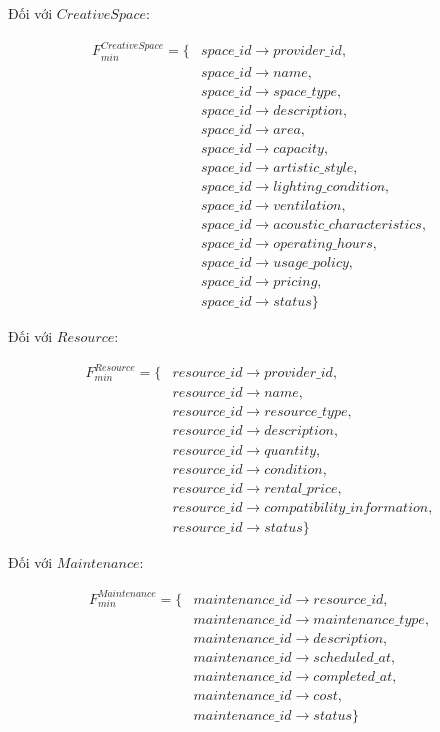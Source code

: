 Đối với $CreativeSpace$:

\[
\begin{aligned}
	F_{min}^{CreativeSpace}=\{&
	space\_id\rightarrow provider\_id,\\
	&space\_id\rightarrow name,\\
	&space\_id\rightarrow space\_type,\\
	&space\_id\rightarrow description,\\
	&space\_id\rightarrow area,\\
	&space\_id\rightarrow capacity,\\
	&space\_id\rightarrow artistic\_style,\\
	&space\_id\rightarrow lighting\_condition,\\
	&space\_id\rightarrow ventilation,\\
	&space\_id\rightarrow acoustic\_characteristics,\\
	&space\_id\rightarrow operating\_hours,\\
	&space\_id\rightarrow usage\_policy,\\
	&space\_id\rightarrow pricing,\\
	&space\_id\rightarrow status
	\}
\end{aligned}
\]

Đối với $Resource$:

\[
\begin{aligned}
	F_{min}^{Resource}=\{&
	resource\_id\rightarrow provider\_id,\\
	&resource\_id\rightarrow name,\\
	&resource\_id\rightarrow resource\_type,\\
	&resource\_id\rightarrow description,\\
	&resource\_id\rightarrow quantity,\\
	&resource\_id\rightarrow condition,\\
	&resource\_id\rightarrow rental\_price,\\
	&resource\_id\rightarrow compatibility\_information,\\
	&resource\_id\rightarrow status
	\}
\end{aligned}
\]

Đối với $Maintenance$:

\[
\begin{aligned}
	F_{min}^{Maintenance}=\{&
	maintenance\_id\rightarrow resource\_id,\\
	&maintenance\_id\rightarrow maintenance\_type,\\
	&maintenance\_id\rightarrow description,\\
	&maintenance\_id\rightarrow scheduled\_at,\\
	&maintenance\_id\rightarrow completed\_at,\\
	&maintenance\_id\rightarrow cost,\\
	&maintenance\_id\rightarrow status
	\}
\end{aligned}
\]

